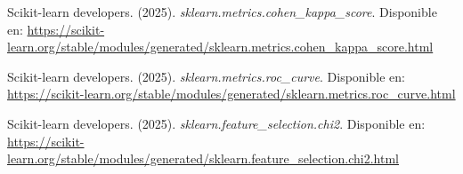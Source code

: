 \documentclass{article}
\begin{document}
\begin{thebibliography}{9}
Scikit-learn developers. (2025). \textit{sklearn.metrics.cohen\_kappa\_score}. 
Disponible en: \url{https://scikit-learn.org/stable/modules/generated/sklearn.metrics.cohen_kappa_score.html}

Scikit-learn developers. (2025). \textit{sklearn.metrics.roc\_curve}. 
Disponible en: \url{https://scikit-learn.org/stable/modules/generated/sklearn.metrics.roc_curve.html}

Scikit-learn developers. (2025). \textit{sklearn.feature\_selection.chi2}. 
Disponible en: \url{https://scikit-learn.org/stable/modules/generated/sklearn.feature_selection.chi2.html}

\end{thebibliography}
\end{document}
